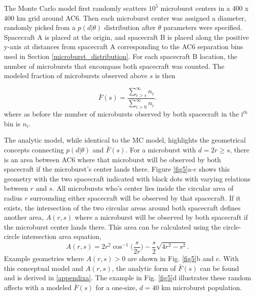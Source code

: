 \documentclass[draft]{agujournal2019}
\begin{document}
The Monte Carlo model first randomly scatters $10^5$ microburst centers in a 400 x 400 km grid around AC6. Then each microburst center was assigned a diameter, randomly picked from a $p(d | \theta)$ distribution after $\theta$ parameters were specified. Spacecraft A is placed at the origin, and spacecraft B is placed along the positive y-axis at distances from spacecraft A corresponding to the AC6 separation bins used in Section \ref{microburst_distribution}. For each spacecraft B location, the number of microbursts that encompass both spacecraft was counted. The modeled fraction of microbursts observed above $s$ is then

\begin{equation}
\bar{F}(s) = \frac{\displaystyle\sum_{i > s}^\infty n_{i} }{ \displaystyle\sum_{i > 0}^\infty n_{i} }.
\end{equation} where as before the number of microbursts observed by both spacecraft in the i$^{th}$ bin is $n_{i}$.

The analytic model, while identical to the MC model, highlights the geometrical concepts connecting $p(d | \theta)$ and $\bar{F}(s)$. For a microburst with $d = 2r \geq s$, there is an area between AC6 where that microburst will be observed by both spacecraft if the microburst's center lands there. Figure \ref{fig5}a-c shows this geometry with the two spacecraft indicated with black dots with varying relations between $r$ and $s$. All microbursts who's center lies inside the circular area of radius $r$ surrounding either spacecraft will be observed by that spacecraft. If it exists, the intersection of the two circular areas around both spacecraft defines another area, $A(r, s)$ where a microburst will be observed by both spacecraft if the microburst center lands there. This area can be calculated using the circle-circle intersection area equation, 
\begin{equation} \label{circle_circle_intersect}
A(r, s) = 2r^2 \cos^{-1}{\Big( \frac{s}{2r} \Big)} - \frac{s}{2} \sqrt{4r^2 - s^2}.
\end{equation} Example geometries where $A(r, s) > 0$ are shown in Fig. \ref{fig5}b and c. With this conceptual model and $A(r, s)$, the analytic form of $\bar{F}(s)$ can be found and is derived in \ref{appendixa}. The example in Fig. \ref{fig5}d illustrates these random affects with a modeled $\bar{F}(s)$ for a one-size, $d=40$ km microburst population.

\end{document}
